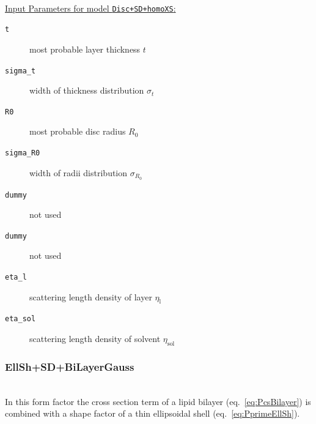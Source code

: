 \hspace{1pt}\\
\underline{Input Parameters for model \texttt{Disc+SD+homoXS}:}\\
\begin{description}
\item[\texttt{t}] most probable layer thickness $t$
\item[\texttt{sigma\_t}] width of thickness distribution $\sigma_t$
\item[\texttt{R0}] most probable disc radius $R_0$
\item[\texttt{sigma\_R0}] width of radii distribution $\sigma_{R_0}$
\item[\texttt{dummy}] not used
\item[\texttt{dummy}] not used
\item[\texttt{eta\_l}] scattering length density of layer $\eta_\mathrm{l}$
\item[\texttt{eta\_sol}] scattering length density of solvent $\eta_\mathrm{sol}$
\end{description}

\vspace{5mm}

\noindent
\subsubsection{EllSh+SD+BiLayerGauss} ~\\

\noindent
In this form factor the cross section term of a lipid bilayer (eq.\ \ref{eq:PcsBilayer}) is combined with a shape factor of a thin ellipsoidal shell (eq.\ \ref{eq:PprimeEllSh}).

\vspace{5mm}

